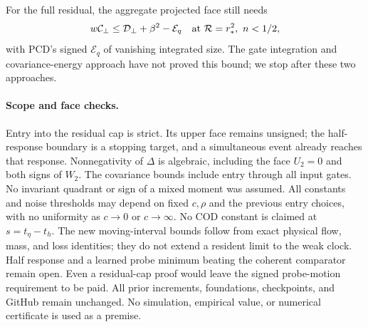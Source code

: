 \documentclass[11pt]{article}
\begin{document}
For the full residual, the aggregate projected face still needs
\[
 w\mathcal C_\perp\le\mathcal D_\perp+\beta^2-\mathcal E_q
 \quad\hbox{at }\mathcal R=r_*^2,\ n<1/2,
\]
with PCD's signed $\mathcal E_q$ of vanishing integrated size.
The gate integration and covariance-energy approach have not
proved this bound; we stop after these two approaches.

\paragraph{Scope and face checks.}
Entry into the residual cap is strict. Its upper face remains
unsigned; the half-response boundary is a stopping target, and a
simultaneous event already reaches that response. Nonnegativity of
$\Delta$ is algebraic, including the face $U_2=0$ and both signs
of $W_2$. The covariance bounds include entry through all input
gates. No invariant quadrant or sign of a mixed moment was assumed.
All constants and noise thresholds may depend on fixed $c,\rho$
and the previous entry choices, with no uniformity as $c\to0$ or
$c\to\infty$. No COD constant is claimed at $s=t_\eta-t_h$.
The new moving-interval bounds follow from exact physical flow,
mass, and loss identities; they do not extend a resident limit to
the weak clock. Half response and a learned probe minimum beating
the coherent comparator remain open. Even a residual-cap proof
would leave the signed probe-motion requirement to be paid.
All prior increments, foundations, checkpoints, and GitHub remain
unchanged. No simulation, empirical value, or numerical certificate
is used as a premise.
\end{document}
